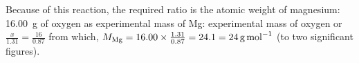 \documentclass{article}
\begin{document}
Because of this reaction, the required ratio is the atomic weight of magnesium: \SI{16.00}{\gram} of oxygen as experimental mass of Mg: experimental mass of oxygen or $\frac{x}{1.31}=\frac{16}{0.87}$ from which, $M_{\ce{Mg}} = 16.00 \times \frac{1.31}{0.87} = 24.1 = \SI{24}{\gram\per\mole}$ (to two significant figures).






\end{document}
